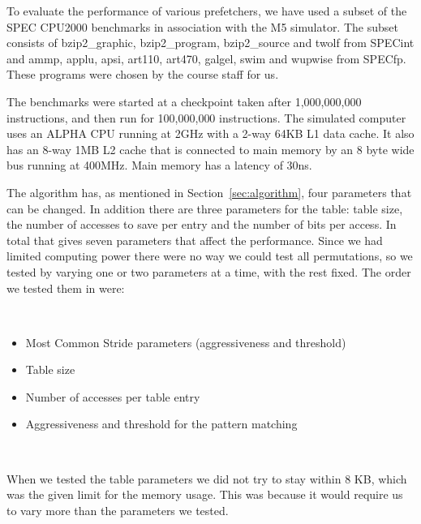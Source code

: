 To evaluate the performance of various prefetchers, we have used
a subset of the SPEC CPU2000 benchmarks in association with the M5
simulator. The subset consists of bzip2\_graphic, bzip2\_program, bzip2\_source and twolf from
SPECint and ammp, applu, apsi, art110, art470, galgel, swim and wupwise from SPECfp.
These programs were chosen by the course staff for us.

The benchmarks were started at a checkpoint taken after
1,000,000,000 instructions, and then run for 100,000,000 instructions.
The simulated computer uses an ALPHA CPU running at 2GHz
with a 2-way 64KB L1 data cache. It also has an 8-way 1MB L2 cache that is
connected to main memory by an 8 byte wide bus running at
400MHz. Main memory has a latency of 30ns.

The algorithm has, as mentioned in Section~\ref{sec:algorithm}, four parameters that can be changed. In addition there are
three parameters for the table: table size, the number of accesses to save per
entry and the number of bits per access. In total that gives seven parameters
that affect the performance. Since we had limited computing power there were no
way we could test all permutations, so we tested by varying one or two
parameters at a time, with the rest fixed. The order we tested them in were:

~
\begin{itemize}
	\item Most Common Stride parameters (aggressiveness and threshold)
	\item Table size
	\item Number of accesses per table entry
	\item Aggressiveness and threshold for the pattern matching
\end{itemize}
~

When we tested the table parameters we did not try to stay within 8 KB, which
was the given limit for the memory usage. This was because it would require us to
vary more than the parameters we tested.
